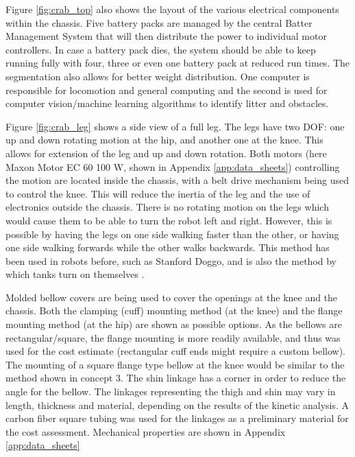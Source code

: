 Figure \ref{fig:crab_top} also shows the layout of the various electrical components within the chassis. Five battery packs are managed by the central Batter Management System that will then distribute the power to individual motor controllers. In case a battery pack dies, the system should be able to keep running fully with four, three or even one battery pack at reduced run times. The segmentation also allows for better weight distribution.
One computer is responsible for locomotion and general computing and the second is used for computer vision/machine learning algorithms to identify litter and obstacles.

Figure \ref{fig:crab_leg} shows a side view of a full leg. The legs have two DOF: one up and down rotating motion at the hip, and another one at the knee. This allows for extension of the leg and up and down rotation. Both motors (here Maxon Motor EC 60 100 W, shown in Appendix \ref{app:data_sheets}) controlling the motion are located inside the chassis, with a belt drive mechanism being used to control the knee. This will reduce the inertia of the leg and the use of electronics outside the chassis. There is no rotating motion on the legs which would cause them to be able to turn the robot left and right. However, this is possible by having the legs on one side walking faster than the other, or having one side walking forwards while the other walks backwards. This method has been used in robots before, such as Stanford Doggo, and is also the method by which tanks turn on themselves \cite{kau_stanford_2019}.

Molded bellow covers are being used to cover the openings at the knee and the chassis. Both the clamping (cuff) mounting method (at the knee) and the flange mounting method (at the hip) are shown as possible options. As the bellows are rectangular/square, the flange mounting is more readily available, and thus was used for the cost estimate (rectangular cuff ends might require a custom bellow). The mounting of a square flange type bellow at the knee would be similar to the method shown in concept 3. The shin linkage has a corner in order to reduce the angle for the bellow. The linkages representing the thigh and shin may vary in length, thickness and material, depending on the results of the kinetic analysis. A carbon fiber square tubing was used for the linkages as a preliminary material for the cost assessment. Mechanical properties are shown in Appendix \ref{app:data_sheets}

